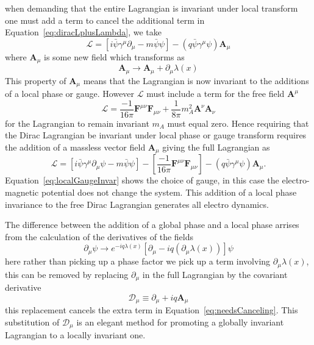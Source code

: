when demanding that the entire Lagrangian is invariant under local transform 
one must add a term to cancel the additional term in 
Equation~\eqref{eq:diracLplusLambda}, we take
\begin{equation}
  \mathcal{L} = \left[i\bar{\psi}\gamma^{\mu}\partial_{\mu} - m \bar{\psi}\psi\right] - \left(q\bar{\psi}\gamma^{\mu}\psi\right)\bm{A}_{\mu}
\end{equation}
where $\bm{A}_{\mu}$ is some new field which transforms as
\begin{equation}
  \bm{A}_{\mu}\rightarrow \bm{A}_{\mu} + \partial_{\mu}\lambda(x)
  \label{eq:localGaugeInvar}
\end{equation}
This property of $\bm{A}_{\mu}$ means that the Lagrangian is now invariant to 
the additions of a local phase or gauge. However $\mathcal{L}$ must include a 
term for the free field $\bm{A}^{\mu}$
\begin{equation}
  \mathcal{L} = \frac{-1}{16\pi}\bm{F}^{\mu\nu}\bm{F}_{\mu\nu} + \frac{1}{8\pi}m_{A}^{2}\bm{A}^{\nu}\bm{A}_{\nu}
\end{equation}
for the Lagrangian to remain invariant $m_{A}$ must equal zero. Hence requiring 
that the Dirac Lagrangian be invariant under local phase or gauge transform 
requires the addition of a massless vector field $\bm{A}_{\mu}$ giving the full 
Lagrangian as
\begin{equation}
  \mathcal{L} = \left[i\bar{\psi}\gamma^{\mu}\partial_{\mu}\psi - m \bar{\psi}\psi\right] - \left[\frac{-1}{16\pi}\bm{F}^{\mu\nu}\bm{F}_{\mu\nu}\right] - \left(q\bar{\psi}\gamma^{\mu}\psi\right)\bm{A}_{\mu}.
\end{equation}
Equation~\eqref{eq:localGaugeInvar} shows the choice of gauge, in this case the 
electro-magnetic potential does not change the system. This addition of a local 
phase invariance to the free Dirac Lagrangian generates all electro dynamics.

The difference between the addition of a global phase and a local phase arrises 
from the calculation of the derivatives of the fields
\begin{equation}
  \partial_{\mu}\psi\rightarrow e^{-iq\lambda(x)}\left[\partial_{\mu}- iq\left(\partial_{\mu}\lambda(x)\right)\right]\psi
  \label{eq:needsCanceling}
\end{equation}
here rather than picking up a phase factor we pick up a term involving 
$\partial_{\mu}\lambda(x)$, this can be removed by replacing $\partial_{\mu}$ 
in the full Lagrangian by the covariant derivative
\begin{equation}
  \mathcal{D}_{\mu} \equiv \partial_{\mu} + iq\bm{A}_{\mu}
\end{equation}
this replacement cancels the extra term in Equation~\eqref{eq:needsCanceling}. 
This substitution of $\mathcal{D}_{\mu}$ is an elegant method for promoting a 
globally invariant Lagrangian to a locally invariant one.

